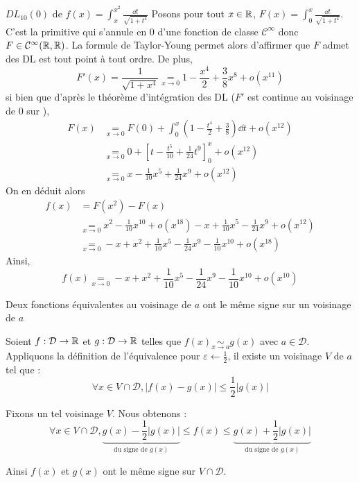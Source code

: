 \documentclass{article}
\renewenvironment{question_kholle}[2][ ]
{
	\subsection{\texorpdfstring{#2}{}}
	\notblank{#1}
	{
		\noindent #1
		\bigbreak
	}
	{}
	\begin{proof}
}
{
	\end{proof}
}
\begin{document}
\begin{question_kholle}{$DL_{10}(0)$ de $f(x)=\displaystyle\int_{x}^{x^{2}}\frac{\dd t}{\sqrt{1+t^{4}}}$}
	Posons pour tout $x\in\mathbb R$, $F(x)=\int_{0}^{x}\frac{\dd t}{\sqrt{1+t^{4}}}$. C’est la primitive qui s’annule en $0$ d’une fonction de classe $\mathcal{C}^{\infty}$ donc $F\in \mathcal{C}^{\infty}(\mathbb R, \mathbb R)$. La formule de Taylor-Young permet alors d’affirmer que $F$ admet des DL est tout point à tout ordre. De plus,
	\[
		F'(x) = \frac{1}{\sqrt{1+x^{4}}} \underset{x\to 0}{=} 1-\frac{x^{4}}{2} + \frac{3}{8}x^{8}+o(x^{11})
	\]
	si bien que d’après le théorème d’intégration des DL ($F'$ est continue au voisinage de 0 sur \R),
	\begin{align*}
		F(x) & \underset{x\to 0}{=} F(0)+\int_{0}^{x}\left(1-\frac{t^{4}}{2}+\frac{3}{8}\right)\dd t + o(x^{12}) \\
		     & \underset{x\to 0}{=} 0+\left[t-\frac{t^{5}}{10} + \frac{1}{24}t^{9}\right]_{0}^{x} + o(x^{12})    \\
		     & \underset{x\to 0}{=} x-\frac{1}{10}x^{5} + \frac{1}{24}x^{9} + o(x^{12})
	\end{align*}
	On en déduit alors
	\begin{align*}
		f(x) & = F(x^{2}) - F(x)                                                                                              \\
		     & \underset{x\to 0}{=} x^{2}-\frac{1}{10}x^{10} + o(x^{18}) - x+\frac{1}{10}x^{5} -\frac{1}{24}x^{9} + o(x^{12}) \\
		     & \underset{x\to 0}{=} -x+x^{2}+\frac{1}{10}x^{5}-\frac{1}{24}x^{9}-\frac{1}{10}x^{10}+o(x^{18})
	\end{align*}
	Ainsi,
	\[
		f(x)\underset{x\to 0}{=} -x+x^{2}+\frac{1}{10}x^{5} - \frac{1}{24}x^{9} - \frac{1}{10}x^{10} + o(x^{10})
	\]
\end{question_kholle}

\begin{question_kholle}
	{Deux fonctions équivalentes au voisinage de $a$ ont le même signe sur un voisinage de $a$}

	Soient $f : \mathcal{D} \rightarrow \mathbb R$ et $g : \mathcal{D} \rightarrow \mathbb R$ telles que $f(x) \underset{x \rightarrow a}{\sim} g(x)$ avec $a \in \mathcal{D}$. \\
	Appliquons la définition de l'équivalence pour $\varepsilon \leftarrow \frac{1}{2}$, il existe un voisinage $V$ de $a$ tel que :
	\begin{equation*}
		\forall x \in V \cap \mathcal{D},
		| f(x) - g(x) | \leqslant \frac{1}{2} | g(x) |
	\end{equation*}

	Fixons un tel voisinage $V$.
	Nous obtenons :
	\begin{equation*}
		\forall x \in V \cap \mathcal{D},
		\underbrace{g(x) - \frac{1}{2} | g(x) |}_{\text{du signe de }g(x)}
		\leqslant f(x) \leqslant
		\underbrace{g(x) + \frac{1}{2} | g(x) |}_{\text{du signe de }g(x)}
	\end{equation*}

	Ainsi $f(x)$ et $g(x)$ ont le même signe sur $V \cap \mathcal{D}$.
\end{question_kholle}
\end{document}
